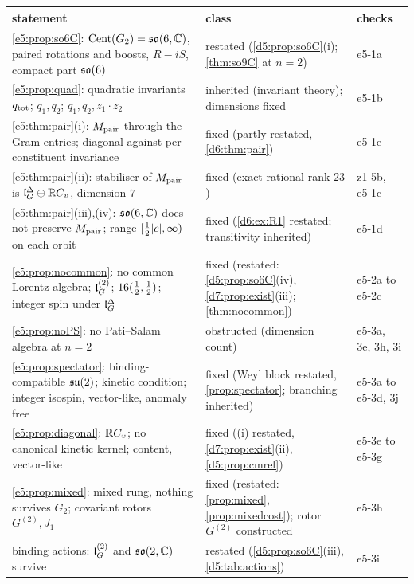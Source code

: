 \begin{table}[htbp]
\centering
\footnotesize
\begin{tabular}{@{}>{\raggedright\arraybackslash}p{8.0cm}>{\raggedright\arraybackslash}p{4.7cm}>{\raggedright\arraybackslash}p{2.1cm}@{}}
\toprule
statement & class & checks\\
\midrule
\cref{e5:prop:so6C}: $\operatorname{Cent}(G_2)=\mathfrak{so}(6,\mathbb{C})$, paired rotations and boosts, $R-iS$, compact part $\mathfrak{so}(6)$ & restated (\cref{d5:prop:so6C}(i); \cref{thm:so9C} at $n=2$) & e5-1a\\
\cref{e5:prop:quad}: quadratic invariants $q_{\rm tot}$; $q_1,q_2$; $q_1,q_2,z_1\cdot z_2$ & inherited (invariant theory); dimensions fixed & e5-1b\\
\cref{e5:thm:pair}(i): $M_{\rm pair}$ through the Gram entries; diagonal against per-constituent invariance & fixed (partly restated, \cref{d6:thm:pair}) & e5-1e\\
\cref{e5:thm:pair}(ii): stabiliser of $M_{\rm pair}$ is $\mathfrak l_G^\Delta\oplus\mathbb{R} C_v$, dimension $7$ & fixed (exact rational rank $23$) & z1-5b, e5-1c\\
\cref{e5:thm:pair}(iii),(iv): $\mathfrak{so}(6,\mathbb{C})$ does not preserve $M_{\rm pair}$; range $[\tfrac12|c|,\infty)$ on each orbit & fixed (\cref{d6:ex:R1} restated; transitivity inherited) & e5-1d\\
\cref{e5:prop:nocommon}: no common Lorentz algebra; $\mathfrak l_G^{(2)}$; $16(\tfrac12,\tfrac12)$; integer spin under $\mathfrak l_G^\Delta$ & fixed (restated: \cref{d5:prop:so6C}(iv), \cref{d7:prop:exist}(iii); \cref{thm:nocommon}) & e5-2a to e5-2c\\
\cref{e5:prop:noPS}: no Pati--Salam algebra at $n=2$ & obstructed (dimension count) & e5-3a, 3e, 3h, 3i\\
\cref{e5:prop:spectator}: binding-compatible $\mathfrak{su}(2)$; kinetic condition; integer isospin, vector-like, anomaly free & fixed (Weyl block restated, \cref{prop:spectator}; branching inherited) & e5-3a to e5-3d, 3j\\
\cref{e5:prop:diagonal}: $\mathbb{R} C_v$; no canonical kinetic kernel; content, vector-like & fixed ((i) restated, \cref{d7:prop:exist}(ii), \cref{d5:prop:cmrel}) & e5-3e to e5-3g\\
\cref{e5:prop:mixed}: mixed rung, nothing survives $G_2$; covariant rotors $G^{(2)},J_1$ & fixed (restated: \cref{prop:mixed}, \cref{prop:mixedcost}); rotor $G^{(2)}$ constructed & e5-3h\\
binding actions: $\mathfrak l_G^{(2)}$ and $\mathfrak{so}(2,\mathbb{C})$ survive & restated (\cref{d5:prop:so6C}(iii), \cref{d5:tab:actions}) & e5-3i\\

\end{tabular}
\end{table}
